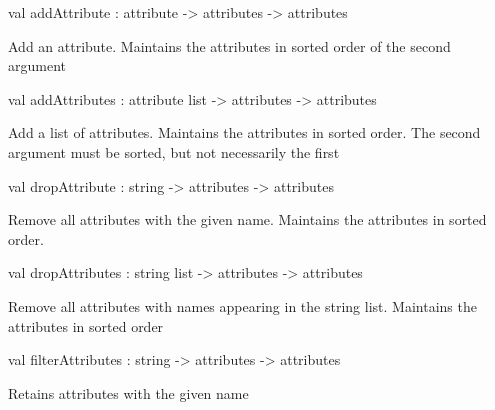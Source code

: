 \documentclass[11pt]{article}
\begin{document}
\label{val:Cil.addAttribute}\begin{ocamldoccode}
val addAttribute : attribute -> attributes -> attributes
\end{ocamldoccode}
\begin{ocamldocdescription}
Add an attribute. Maintains the attributes in sorted order of the second 
    argument


\end{ocamldocdescription}




\label{val:Cil.addAttributes}\begin{ocamldoccode}
val addAttributes : attribute list -> attributes -> attributes
\end{ocamldoccode}
\begin{ocamldocdescription}
Add a list of attributes. Maintains the attributes in sorted order. The 
    second argument must be sorted, but not necessarily the first


\end{ocamldocdescription}




\label{val:Cil.dropAttribute}\begin{ocamldoccode}
val dropAttribute : string -> attributes -> attributes
\end{ocamldoccode}
\begin{ocamldocdescription}
Remove all attributes with the given name. Maintains the attributes in 
    sorted order.


\end{ocamldocdescription}




\label{val:Cil.dropAttributes}\begin{ocamldoccode}
val dropAttributes : string list -> attributes -> attributes
\end{ocamldoccode}
\begin{ocamldocdescription}
Remove all attributes with names appearing in the string list.
  Maintains the attributes in sorted order


\end{ocamldocdescription}




\label{val:Cil.filterAttributes}\begin{ocamldoccode}
val filterAttributes : string -> attributes -> attributes
\end{ocamldoccode}
\begin{ocamldocdescription}
Retains attributes with the given name


\end{ocamldocdescription}
\end{document}
